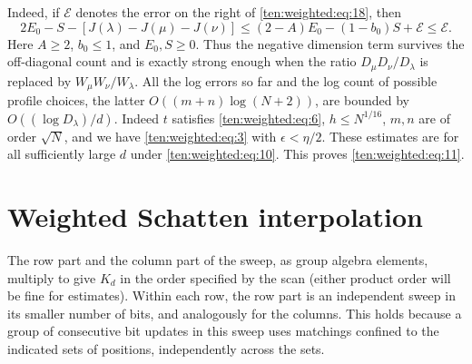 Indeed, if $\mathcal E$ denotes the error on the right of \eqref{ten:weighted:eq:18}, then
\[
 2E_0-S-[J(\lambda)-J(\mu)-J(\nu)]
 \le (2-A)E_0-(1-b_0)S+\mathcal E\le\mathcal E.
\]
Here $A\ge2$, $b_0\le1$, and $E_0,S\ge0$. Thus the negative dimension term survives the off-diagonal count and is exactly strong enough when the ratio $D_\mu D_\nu/D_\lambda$ is replaced by $W_\mu W_\nu/W_\lambda$. All the log errors so far and the log count of possible profile choices, the latter \(O((m+n)\log(N+2))\), are bounded by \(O((\log D_\lambda)/d)\). Indeed \(t\) satisfies \eqref{ten:weighted:eq:6}, \(h\le N^{1/16}\), \(m,n\) are of order \(\sqrt N\), and we have \eqref{ten:weighted:eq:3} with \(\epsilon<\eta/2\). These estimates are for all sufficiently large \(d\) under \eqref{ten:weighted:eq:10}. This proves \eqref{ten:weighted:eq:11}.


\section{Weighted Schatten interpolation}
\label{ten:weighted:part:249}
The row part and the column part of the sweep, as group algebra elements, multiply to give \(K_d\) in the order specified by the scan (either product order will be fine for estimates). Within each row, the row part is an independent sweep in its smaller number of bits, and analogously for the columns. This holds because a group of consecutive bit updates in this sweep uses matchings confined to the indicated sets of positions, independently across the sets.


